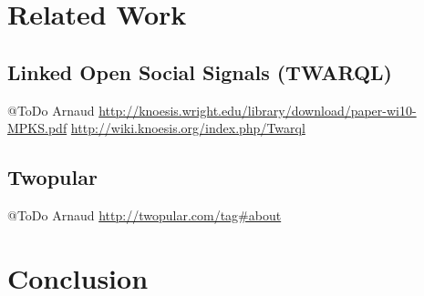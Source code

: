 \documentclass[runningheads,a4paper]{llncs}
\begin{document}
\section{Related Work}
\subsection{Linked Open Social Signals (TWARQL)}
@ToDo Arnaud
\url{http://knoesis.wright.edu/library/download/paper-wi10-MPKS.pdf} \url{http://wiki.knoesis.org/index.php/Twarql}
\subsection{Twopular}
@ToDo Arnaud
\url{http://twopular.com/tag#about}
\section{Conclusion}





\end{document}
